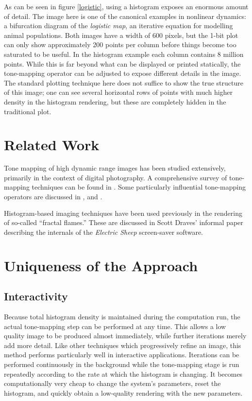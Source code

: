 \documentclass[letterpaper, 11pt]{article}
\begin{document}
As can be seen in figure \ref{logistic}, using a histogram exposes an enormous amount of
detail.  The image here is one of the canonical examples in nonlinear dynamics: a bifurcation
diagram of the \emph{logistic map}, an iterative equation for modelling animal populations.
Both images have a width of 600 pixels, but the 1-bit plot can only show approximately 200
points per column before things become too saturated to be useful.  In the histogram example
each column contains 8 million points.  While this is far beyond what can be displayed or
printed statically, the tone-mapping operator can be adjusted to expose different details
in the image.  The standard plotting technique here does not suffice to show the true structure
of this image;  one can see several horizontal rows of points with much higher density in
the histogram rendering, but these are completely hidden in the traditional plot.

\section{Related Work}
Tone mapping of high dynamic range images has been studied extensively, primarily in the
context of digital photography.  A comprehensive survey of tone-mapping techniques can be
found in \cite{kd}.  Some particularly influential tone-mapping operators are discussed
in \cite{jt}, \cite{jtjhbg} and \cite{gw}.

Histogram-based imaging techniques have been used previously in the rendering of so-called
``fractal flames.''  These are discussed in Scott Draves' informal paper describing the
internals of the \emph{Electric Sheep} screen-saver software\cite{sd}.

\section{Uniqueness of the Approach}

\subsection{Interactivity}
Because total histogram density is maintained during the computation run, the actual
tone-mapping step can be performed at any time.  This allows a low quality image to
be produced almost immediately, while further iterations merely add more detail.  Like
other techniques which progressively refine an image, this method performs particularly
well in interactive applications.  Iterations can be performed continuously in the
background while the tone-mapping stage is run repeatedly according to the rate at which
the histogram is changing.  It becomes computationally very cheap to change the system's
parameters, reset the histogram, and quickly obtain a low-quality rendering with the
new parameters.
\end{document}
